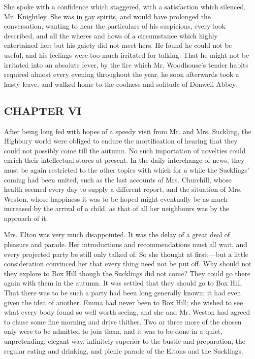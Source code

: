 She spoke with a confidence which staggered, with a satisfaction which silenced, Mr. Knightley. She was in gay spirits, and would have prolonged the conversation, wanting to hear the particulars of his suspicions, every look described, and all the wheres and hows of a circumstance which highly entertained her: but his gaiety did not meet hers. He found he could not be useful, and his feelings were too much irritated for talking. That he might not be irritated into an absolute fever, by the fire which Mr. Woodhouse's tender habits required almost every evening throughout the year, he soon afterwards took a hasty leave, and walked home to the coolness and solitude of Donwell Abbey.

\subsection[chapter-vi-2]{\useURL[url44][][][]\from[url44]CHAPTER VI}

After being long fed with hopes of a speedy visit from Mr. and Mrs. Suckling, the Highbury world were obliged to endure the mortification of hearing that they could not possibly come till the autumn. No such importation of novelties could enrich their intellectual stores at present. In the daily interchange of news, they must be again restricted to the other topics with which for a while the Sucklings' coming had been united, such as the last accounts of Mrs. Churchill, whose health seemed every day to supply a different report, and the situation of Mrs. Weston, whose happiness it was to be hoped might eventually be as much increased by the arrival of a child, as that of all her neighbours was by the approach of it.

Mrs. Elton was very much disappointed. It was the delay of a great deal of pleasure and parade. Her introductions and recommendations must all wait, and every projected party be still only talked of. So she thought at first;---but a little consideration convinced her that every thing need not be put off. Why should not they explore to Box Hill though the Sucklings did not come? They could go there again with them in the autumn. It was settled that they should go to Box Hill. That there was to be such a party had been long generally known: it had even given the idea of another. Emma had never been to Box Hill; she wished to see what every body found so well worth seeing, and she and Mr. Weston had agreed to chuse some fine morning and drive thither. Two or three more of the chosen only were to be admitted to join them, and it was to be done in a quiet, unpretending, elegant way, infinitely superior to the bustle and preparation, the regular eating and drinking, and picnic parade of the Eltons and the Sucklings.

